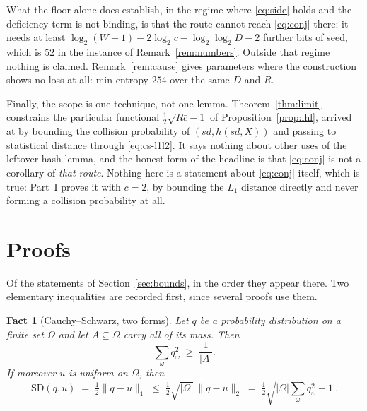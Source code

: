 \documentclass{aicr-solution}
\newcommand{\sd}{\mathit{sd}}
\newcommand{\SD}{\mathrm{SD}}
\newtheorem{fact}{Fact}
\begin{document}
What the floor alone does establish, in the regime where \eqref{eq:side} holds and the deficiency
term is not binding, is that the route cannot reach \eqref{eq:conj} there: it needs at least
$\log_2(W-1) - 2\log_2 c - \log_2\log_2 D - 2$ further bits of seed, which is $52$ in the instance
of Remark~\ref{rem:numbers}. Outside that regime nothing is claimed. Remark~\ref{rem:cause} gives
parameters where the construction shows no loss at all: min-entropy $254$ over the same $D$ and
$R$.

Finally, the scope is one technique, not one lemma. Theorem~\ref{thm:limit} constrains the
particular functional $\tfrac12\sqrt{R\bar c - 1}$ of Proposition~\ref{prop:lhl}, arrived at by
bounding the collision probability of $(\sd, h(\sd,X))$ and passing to statistical distance through
\eqref{eq:cs-l1l2}. It says nothing about other uses of the leftover hash lemma, and the honest form
of the headline is that \eqref{eq:conj} is not a corollary of \emph{that route}. Nothing here is a
statement about \eqref{eq:conj} itself, which is true: Part~I proves it with $c = 2$, by
bounding the $L_1$ distance directly and never forming a collision probability at all.



\appendix

\section{Proofs}\label{sec:proofs}

Of the statements of Section~\ref{sec:bounds}, in the order they appear there. Two elementary
inequalities are recorded first, since several proofs use them.

\begin{fact}[Cauchy--Schwarz, two forms]\label{fact:csforms}
Let $q$ be a probability distribution on a finite set $\Omega$ and let $A \subseteq \Omega$ carry
all of its mass. Then
\begin{equation}\label{eq:cs-collide}
  \sum_{\omega} q_\omega^2 \;\ge\; \frac{1}{|A|} .
\end{equation}
If moreover $u$ is uniform on $\Omega$, then
\begin{equation}\label{eq:cs-l1l2}
  \SD(q,u) \;=\; \tfrac12 \|q - u\|_1 \;\le\; \tfrac12\sqrt{|\Omega|}\,\|q-u\|_2
  \;=\; \tfrac12\sqrt{|\Omega|\textstyle\sum_\omega q_\omega^2 - 1} \, .
\end{equation}
\end{fact}
\end{document}

